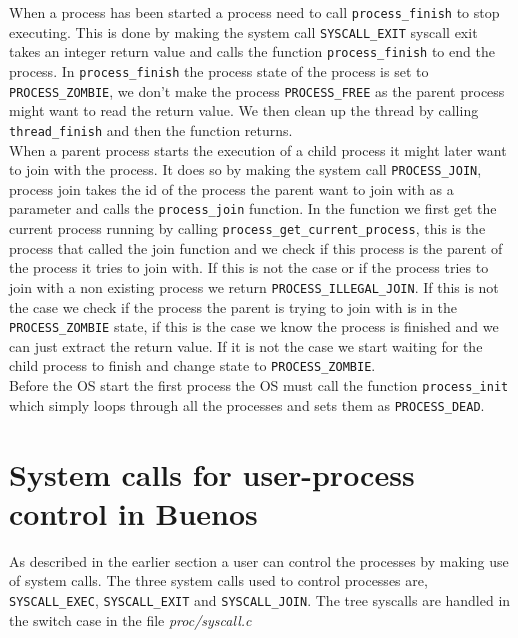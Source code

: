 \documentclass[11pt]{article}
\begin{document}
    When a process has been started a process need to call
    \texttt{process\_finish} to stop executing.  This is done by making the
    system call \texttt{SYSCALL\_EXIT} syscall exit takes an integer return
    value and calls the function \texttt{process\_finish} to end the process. In
    \texttt{process\_finish} the process state of the process is set to
    \texttt{PROCESS\_ZOMBIE}, we don't make the process \texttt{PROCESS\_FREE}
    as the parent process might want to read the return value.  We then clean up
    the thread by calling \texttt{thread\_finish} and then the function
    returns. \\

    When a parent process starts the execution of a child process it might later
    want to join with the process.  It does so by making the system call
    \texttt{PROCESS\_JOIN}, process join takes the id of the process the parent
    want to join with as a parameter and calls the \texttt{process\_join}
    function.  In the function we first get the current process running by
    calling \texttt{process\_get\_current\_process}, this is the process that
    called the join function and we check if this process is the parent of the
    process it tries to join with.  If this is not the case or if the process
    tries to join with a non existing process we return
    \texttt{PROCESS\_ILLEGAL\_JOIN}.  If this is not the case we check if the
    process the parent is trying to join with is in the \texttt{PROCESS\_ZOMBIE}
    state, if this is the case we know the process is finished and we can just
    extract the return value.  If it is not the case we start waiting for the
    child process to finish and change state to \texttt{PROCESS\_ZOMBIE}. \\

    Before the OS start the first process the OS must call the function
    \texttt{process\_init} which simply loops through all the processes and sets
    them as \texttt{PROCESS\_DEAD}.

    \section{System calls for user-process control in Buenos}
    As described in the earlier section a user can control the processes by
    making use of system calls.  The three system calls used to control
    processes are, \texttt{SYSCALL\_EXEC}, \texttt{SYSCALL\_EXIT} and
    \texttt{SYSCALL\_JOIN}.  The tree syscalls are handled in the switch case in
    the file \textit{proc/syscall.c}
\end{document}
